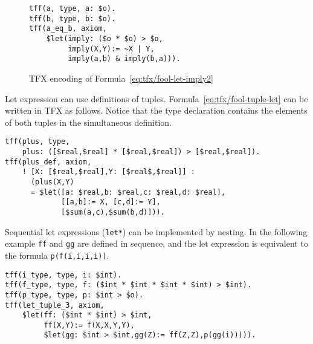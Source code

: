 \begin{figure}[htbp]\centering
\begin{BVerbatim}
tff(a, type, a: $o).
tff(b, type, b: $o).
tff(a_eq_b, axiom,
    $let(imply: ($o * $o) > $o,
         imply(X,Y):= ~X | Y,
         imply(a,b) & imply(b,a))).
\end{BVerbatim}
\caption{TFX encoding of Formula~\ref{eq:tfx/fool-let-imply2}}
\label{fig:tfx/let-tfx2}
\end{figure}


Let expression can use definitions of tuples. 
Formula~\ref{eq:tfx/fool-tuple-let} can be written in TFX as follows. 
Notice that the type declaration contains the elements of both tuples in 
the simultaneous definition.
\begin{verbatim}
tff(plus, type,
    plus: ([$real,$real] * [$real,$real]) > [$real,$real]).
tff(plus_def, axiom,
    ! [X: [$real,$real],Y: [$real$,$real]] :
      (plus(X,Y) 
      = $let([a: $real,b: $real,c: $real,d: $real],
             [[a,b]:= X, [c,d]:= Y],
             [$sum(a,c),$sum(b,d)])).
\end{verbatim}

Sequential let expressions (\verb'let*') can be implemented by nesting. 
In the following example {\tt ff} and {\tt gg} are defined in sequence, and the let expression is equivalent to the formula \verb'p(f(i,i,i,i))'.
\begin{verbatim}
tff(i_type, type, i: $int).
tff(f_type, type, f: ($int * $int * $int * $int) > $int).
tff(p_type, type, p: $int > $o).
tff(let_tuple_3, axiom,
    $let(ff: ($int * $int) > $int,
         ff(X,Y):= f(X,X,Y,Y),
         $let(gg: $int > $int,gg(Z):= ff(Z,Z),p(gg(i))))).
\end{verbatim}

